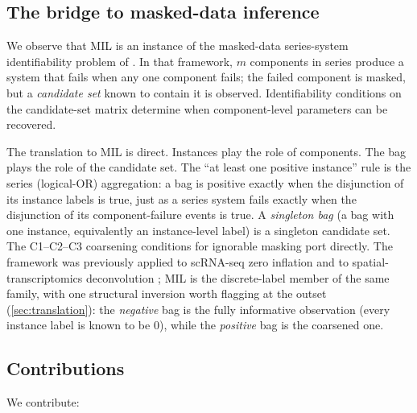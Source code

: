 \subsection{The bridge to masked-data inference}

We observe that MIL is an instance of the masked-data
series-system identifiability problem of \citet{towell2026masked}.
In that framework, $m$ components in series produce a system that
fails when any one component fails; the failed component is masked,
but a \emph{candidate set} known to contain it is observed.
Identifiability conditions on the candidate-set matrix determine
when component-level parameters can be recovered.

The translation to MIL is direct. Instances play the role of
components. The bag plays the role of the candidate set. The ``at
least one positive instance'' rule is the series (logical-OR)
aggregation: a bag is positive exactly when the disjunction of its
instance labels is true, just as a series system fails exactly when
the disjunction of its component-failure events is true. A
\emph{singleton bag} (a bag with one instance, equivalently an
instance-level label) is a singleton candidate set. The
C1--C2--C3 coarsening conditions for ignorable masking port
directly. The framework was previously applied to scRNA-seq zero
inflation \citep{towell2026scrnacoarsening} and to
spatial-transcriptomics deconvolution
\citep{towell2026spatialcoarsening}; MIL is the discrete-label
member of the same family, with one structural inversion worth
flagging at the outset (\cref{sec:translation}): the \emph{negative}
bag is the fully informative observation (every instance label is
known to be $0$), while the \emph{positive} bag is the coarsened
one.

\subsection{Contributions}

We contribute:

